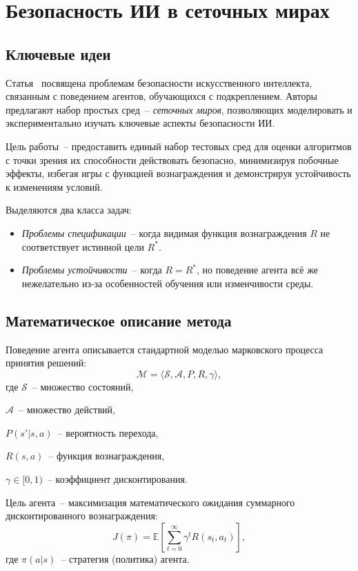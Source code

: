 \section{Безопасность ИИ в сеточных мирах}

\subsection{Ключевые идеи}

Статья~\cite{leike2017aisafety} посвящена проблемам безопасности искусственного интеллекта, связанным с поведением агентов, обучающихся с подкреплением. Авторы предлагают набор простых сред~-- \emph{сеточных миров}, позволяющих моделировать и экспериментально изучать ключевые аспекты безопасности ИИ.

Цель работы~-- предоставить единый набор тестовых сред для оценки алгоритмов с точки зрения их способности действовать безопасно, минимизируя побочные эффекты, избегая игры с функцией вознаграждения и демонстрируя устойчивость к изменениям условий.

Выделяются два класса задач:
\begin{itemize}
    \item \emph{Проблемы спецификации}~-- когда видимая функция вознаграждения $R$ не соответствует истинной цели $R^*$.
    \item \emph{Проблемы устойчивости}~-- когда $R = R^*$, но поведение агента всё же нежелательно из-за особенностей обучения или изменчивости среды.
\end{itemize}

\subsection{Математическое описание метода}

Поведение агента описывается стандартной моделью марковского процесса принятия решений:
\begin{equation}
    \mathcal{M} = \langle \mathcal{S}, \mathcal{A}, P, R, \gamma \rangle,
\end{equation}
где $\mathcal{S}$~-- множество состояний, 

$\mathcal{A}$~-- множество действий, 

$P(s'|s,a)$~-- вероятность перехода,

$R(s,a)$~-- функция вознаграждения, 

$\gamma \in [0,1)$~-- коэффициент дисконтирования.

Цель агента~-- максимизация математического ожидания суммарного дисконтированного вознаграждения:
\begin{equation}
    J(\pi) = \mathbb{E}\left[\sum_{t=0}^{\infty} \gamma^t R(s_t, a_t)\right],
\end{equation}
где $\pi(a|s)$~-- стратегия (политика) агента.

